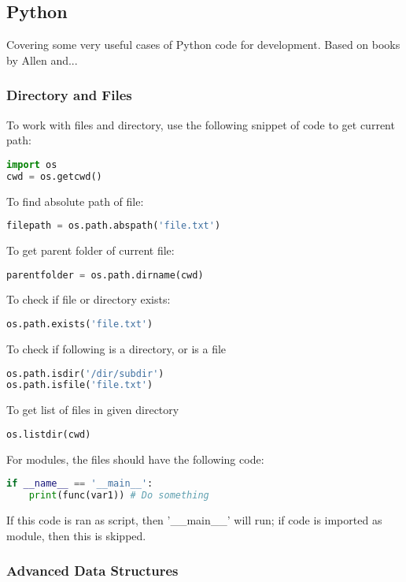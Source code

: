 \subsection{Python}

Covering some very useful cases of Python code for development. Based on books by Allen \cite{downey_2016} and...

\subsubsection{Directory and Files}

To work with files and directory, use the following snippet of code to get current path:
\begin{lstlisting}[language=Python]
import os
cwd = os.getcwd()
\end{lstlisting}
To find absolute path of file:
\begin{lstlisting}[language=Python]
filepath = os.path.abspath('file.txt')
\end{lstlisting}
To get parent folder of current file:
\begin{lstlisting}[language=Python]
parentfolder = os.path.dirname(cwd)
\end{lstlisting}
To check if file or directory exists:
\begin{lstlisting}[language=Python]
os.path.exists('file.txt')
\end{lstlisting}
To check if following is a directory, or is a file
\begin{lstlisting}[language=Python]
os.path.isdir('/dir/subdir')
os.path.isfile('file.txt')
\end{lstlisting}
To get list of files in given directory
\begin{lstlisting}[language=Python]
os.listdir(cwd)
\end{lstlisting}

For modules, the files should have the following code:
\begin{lstlisting}[language=Python]
if __name__ == '__main__':
	print(func(var1)) # Do something
\end{lstlisting}
If this code is ran as script, then '\_\_main\_\_' will run; if code is imported as module, then this is skipped.

\subsubsection{Advanced Data Structures}


